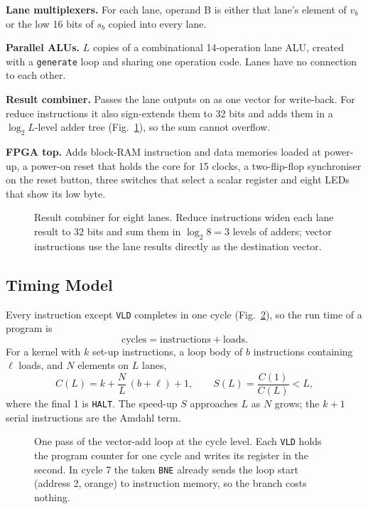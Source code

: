 \documentclass[journal]{IEEEtran}
\begin{document}
\textbf{Lane multiplexers.} For each lane, operand B is either that lane's element of
$v_b$ or the low 16 bits of $s_b$ copied into every lane.

\textbf{Parallel ALUs.} $L$ copies of a combinational 14-operation lane ALU, created
with a \texttt{generate} loop and sharing one operation code. Lanes have no connection
to each other.

\textbf{Result combiner.} Passes the lane outputs on as one vector for write-back. For
reduce instructions it also sign-extends them to 32 bits and adds them in a
$\log_2 L$-level adder tree (Fig.~\ref{fig:combiner}), so the sum cannot overflow.

\textbf{FPGA top.} Adds block-RAM instruction and data memories loaded at power-up, a
power-on reset that holds the core for 15 clocks, a two-flip-flop synchroniser on the
reset button, three switches that select a scalar register and eight LEDs that show its
low byte.

\begin{figure}[t]
\centering

\caption{Result combiner for eight lanes. Reduce instructions widen each lane result to
32 bits and sum them in $\log_2 8 = 3$ levels of adders; vector instructions use the
lane results directly as the destination vector.}
\label{fig:combiner}
\end{figure}

\subsection{Timing Model}
Every instruction except \texttt{VLD} completes in one cycle (Fig.~\ref{fig:timing}),
so the run time of a program is
\begin{equation}
  \text{cycles} = \text{instructions} + \text{loads}.
  \label{eq:cycles}
\end{equation}
For a kernel with $k$ set-up instructions, a loop body of $b$ instructions containing
$\ell$ loads, and $N$ elements on $L$ lanes,
\begin{equation}
  C(L) = k + \frac{N}{L}\,(b + \ell) + 1, \qquad
  S(L) = \frac{C(1)}{C(L)} < L,
  \label{eq:model}
\end{equation}
where the final 1 is \texttt{HALT}. The speed-up $S$ approaches $L$ as $N$ grows; the
$k + 1$ serial instructions are the Amdahl term.

\begin{figure}[t]
\centering

\caption{One pass of the vector-add loop at the cycle level. Each \texttt{VLD} holds the
program counter for one cycle and writes its register in the second. In cycle 7 the
taken \texttt{BNE} already sends the loop start (address 2, orange) to instruction
memory, so the branch costs nothing.}
\label{fig:timing}
\end{figure}
\end{document}
